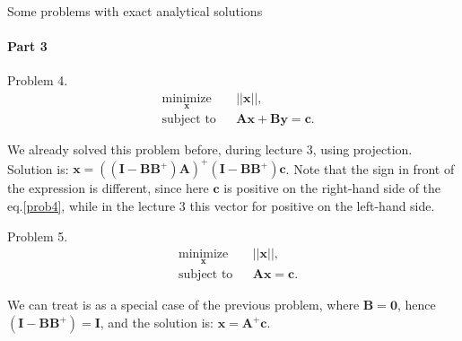 \documentclass{beamer}
\begin{document}
\begin{frame}{Some problems with exact analytical solutions}
\framesubtitle{Part 3}
\begin{flushleft}

Problem 4. 
%
\begin{equation}
\begin{aligned}
& \underset{\mathbf{x}}{\text{minimize}}
& & || \mathbf{x} ||, \\
& \text{subject to}
& & \mathbf{A} \mathbf{x} + \mathbf{B} \mathbf{y} = \mathbf{c}.
\end{aligned}
\label{prob4}
\end{equation}

We already solved this problem before, during lecture 3, using projection. Solution is: $\mathbf{x} = ((\mathbf{I} - \mathbf{B}\mathbf{B}^+) \mathbf{A})^+(\mathbf{I} - \mathbf{B}\mathbf{B}^+) \mathbf{c}$. Note that the sign in front of the expression is different, since here $\mathbf{c}$ is positive on the right-hand side of the eq.\ref{prob4}, while in the lecture 3 this vector for positive on the left-hand side. 

\bigskip

Problem 5. 
%
\begin{equation}
\begin{aligned}
& \underset{\mathbf{x}}{\text{minimize}}
& & || \mathbf{x} ||, \\
& \text{subject to}
& & \mathbf{A} \mathbf{x} = \mathbf{c}.
\end{aligned}
\end{equation}

We can treat is as a special case of the previous problem, where $\mathbf{B} = \mathbf{0}$, hence $(\mathbf{I} - \mathbf{B}\mathbf{B}^+) = \mathbf{I}$, and the solution is: $\mathbf{x} = \mathbf{A}^+\mathbf{c}$.

\end{flushleft}
\end{frame}
\end{document}
